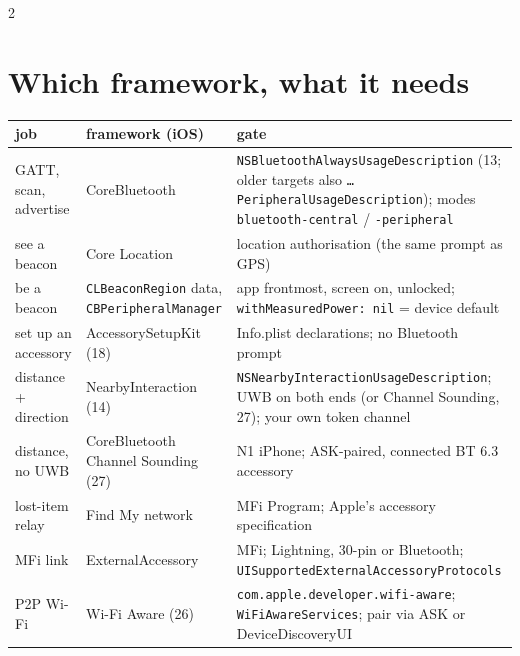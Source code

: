 \documentclass[8pt]{extarticle}
\newcommand\ct[1]{\texttt{#1}}
\begin{document}
\begin{multicols}{2}
\raggedright
\footnotesize{}

\section{Which framework, what it needs}
{\scriptsize\setlength{\tabcolsep}{2pt}
\begin{tabular}{@{}>{\raggedright\arraybackslash}p{13mm}>{\raggedright\arraybackslash}p{20mm}>{\raggedright\arraybackslash}p{43mm}@{}}
\toprule
\textbf{job} & \textbf{framework (iOS)} & \textbf{gate}\\
\midrule
GATT, scan, advertise & CoreBluetooth & \ct{NSBluetoothAlwaysUsageDescription} (13; older targets also \ct{…PeripheralUsageDescription}); modes \ct{bluetooth-central} / \ct{-peripheral}\\
see a beacon & Core Location & location authorisation (the same prompt as GPS)\\
be a beacon & \ct{CLBeaconRegion} data, \ct{CBPeripheral\-Manager} & app frontmost, screen on, unlocked; \ct{withMeasuredPower: nil} = device default\\
set up an accessory & AccessorySetupKit (18) & Info.plist declarations; no Bluetooth prompt\\
distance + direction & NearbyInteraction (14) & \ct{NSNearbyInteractionUsageDescription}; UWB on both ends (or Channel Sounding, 27); your own token channel\\
distance, no UWB & CoreBluetooth Channel Sounding (27) & N1 iPhone; ASK-paired, connected BT 6.3 accessory\\
lost-item relay & Find My network & MFi Program; Apple's accessory specification\\
MFi link & ExternalAccessory & MFi; Lightning, 30-pin or Bluetooth; \ct{UISupportedExternal\-AccessoryProtocols}\\
P2P Wi-Fi & Wi-Fi Aware (26) & \ct{com.apple.developer.wifi-aware}; \ct{WiFiAwareServices}; pair via ASK or DeviceDiscoveryUI\\
\bottomrule
\end{tabular}}


\end{multicols}
\end{document}
